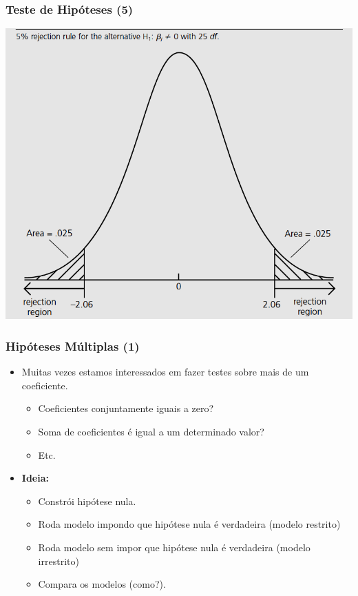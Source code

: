 \documentclass[10pt,slides,xcolor=pdftex,dvipsnames,table]{beamer}
\begin{document}

\begin{frame}[fragile]
	\frametitle{Teste de Hipóteses (5)}

\begin{center}
\includegraphics[height=0.8\textheight]{twosided}
\end{center}

\end{frame}


\begin{frame}[fragile]
	\frametitle{Hipóteses Múltiplas (1)}

\begin{itemize}\itemsep1.2em

\item Muitas vezes estamos interessados em fazer testes sobre mais de um coeficiente.
\begin{itemize}
\item Coeficientes conjuntamente iguais a zero?
\item Soma de coeficientes é igual a um determinado valor?
\item Etc.
\end{itemize} 

\item \textbf{Ideia:}
\begin{itemize}
\item Constrói hipótese nula.
\item Roda modelo impondo que hipótese nula é verdadeira (modelo restrito)
\item Roda modelo sem impor que hipótese nula é verdadeira (modelo irrestrito)
\item Compara os modelos (como?). 
\end{itemize}

\end{itemize}

\end{frame}
\end{document}

